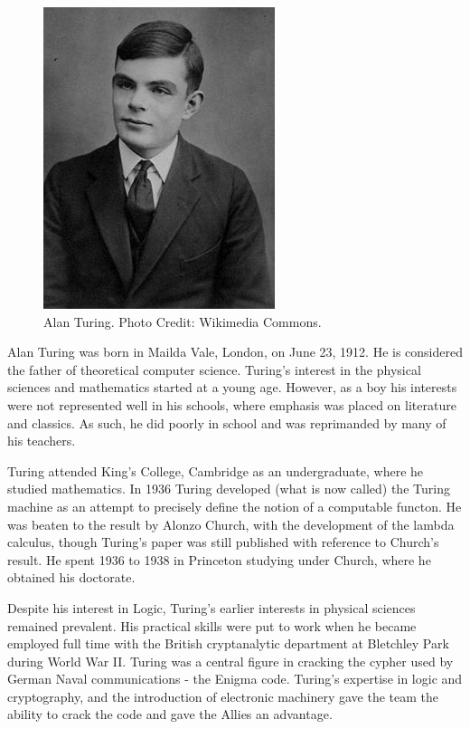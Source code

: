 \documentclass[../../../include/open-logic-section]{subfiles}
\begin{document}
\begin{figure}[h!] 
\centering 
\includegraphics[scale=0.5]{alan-turing.jpg}
\caption{Alan Turing. Photo Credit: Wikimedia Commons.} 
\end{figure}

Alan Turing was born in Mailda Vale, London, on June 23, 1912. He is
considered the father of theoretical computer science. Turing's interest in
the physical sciences and mathematics started at a young age. However, as a
boy his interests were not represented well in his schools, where emphasis
was placed on literature and classics. As such, he did poorly in school and
was reprimanded by many of his teachers.

Turing attended King's College, Cambridge as an undergraduate, where he
studied mathematics. In 1936 Turing developed (what is now called) the
Turing machine as an attempt to precisely define the notion of a computable
functon. He was beaten to the result by Alonzo Church, with the development
of the lambda calculus, though Turing's paper was still published with
reference to Church's result. He spent 1936 to 1938 in Princeton studying
under Church, where he obtained his doctorate.

Despite his interest in Logic, Turing's earlier interests in physical
sciences remained prevalent. His practical skills were put to work when he
became employed full time with the British cryptanalytic department at
Bletchley Park during World War II. Turing was a central figure in cracking
the cypher used by German Naval communications - the Enigma code. Turing's
expertise in logic and cryptography, and the introduction of electronic
machinery gave the team the ability to crack the code and gave the Allies
an advantage.
\end{document}
